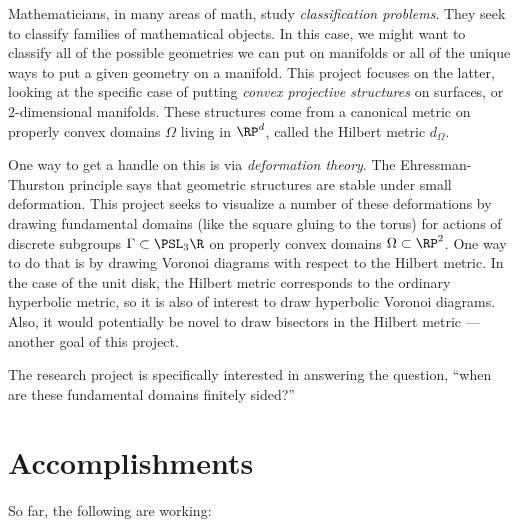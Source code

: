 \documentclass[12pt]{article}%
\begin{document}
Mathematicians, in many areas of math, study \textit{classification problems}. They seek to classify families of mathematical objects. In this case, we might want to classify all of the possible geometries we can put on manifolds or all of the unique ways to put a given geometry on a manifold. This project focuses on the latter, looking at the specific case of putting \textit{convex projective structures} on surfaces, or $2$-dimensional manifolds. These structures come from a canonical metric on properly convex domains $\Omega$ living in $\RP^d$, called the Hilbert metric $d_\Omega$.

One way to get a handle on this is via \textit{deformation theory}. The Ehressman-Thurston principle says that geometric structures are stable under small deformation. This project seeks to visualize a number of these deformations by drawing fundamental domains (like the square gluing to the torus) for actions of discrete subgroups $\Gamma \subset \PSL_3\R$ on properly convex domains $\Omega \subset \RP^2$. One way to do that is by drawing Voronoi diagrams with respect to the Hilbert metric. In the case of the unit disk, the Hilbert metric corresponds to the ordinary hyperbolic metric, so it is also of interest to draw hyperbolic Voronoi diagrams. Also, it would potentially be novel to draw bisectors in the Hilbert metric --- another goal of this project.

The research project is specifically interested in answering the question, ``when are these fundamental domains finitely sided?''\cite{du2023geometry}

\section{Accomplishments}

So far, the following are working:
\end{document}
